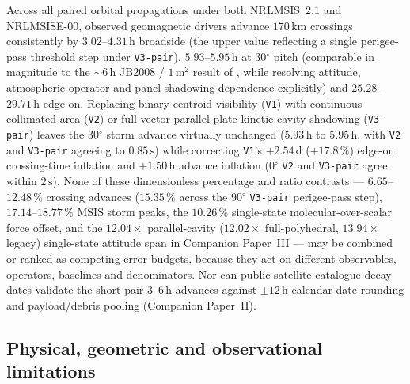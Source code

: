 \documentclass[12pt]{article}
\newcommand{\unit}[1]{\,\mathrm{#1}}
\newcommand{\degree}{\ensuremath{{}^\circ}}
\begin{document}
Across all paired orbital propagations under both NRLMSIS~2.1 and NRLMSISE-00, observed geomagnetic drivers advance $170\unit{km}$ crossings consistently by $3.02$--$4.31\unit{h}$ broadside (the upper value reflecting a single perigee-pass threshold step under \texttt{V3-pair}), $5.93$--$5.95\unit{h}$ at $30\degree$ pitch (comparable in magnitude to the $\sim6\unit{h}$ JB2008 / $1\unit{m^2}$ result of \citet{baruah2024}, while resolving attitude, atmospheric-operator and panel-shadowing dependence explicitly) and $25.28$--$29.71\unit{h}$ edge-on. Replacing binary centroid visibility (\texttt{V1}) with continuous collimated area (\texttt{V2}) or full-vector parallel-plate kinetic cavity shadowing (\texttt{V3-pair}) leaves the $30\degree$ storm advance virtually unchanged ($5.93\unit{h}$ to $5.95\unit{h}$, with \texttt{V2} and \texttt{V3-pair} agreeing to $0.85\unit{s}$) while correcting \texttt{V1}'s $+2.54\unit{d}$ ($+17.8\,\%$) edge-on crossing-time inflation and $+1.50\unit{h}$ advance inflation ($0\degree$ \texttt{V2} and \texttt{V3-pair} agree within $2\unit{s}$). None of these dimensionless percentage and ratio contrasts --- $6.65$--$12.48\,\%$ crossing advances ($15.35\,\%$ across the $90\degree$ \texttt{V3-pair} perigee-pass step), $17.14$--$18.77\,\%$ MSIS storm peaks, the $10.26\,\%$ single-state molecular-over-scalar force offset, and the $12.04\times$ parallel-cavity ($12.02\times$ full-polyhedral, $13.94\times$ legacy) single-state attitude span in Companion Paper~III --- may be combined or ranked as competing error budgets, because they act on different observables, operators, baselines and denominators. Nor can public satellite-catalogue decay dates validate the short-pair $3$--$6\unit{h}$ advances against $\pm12\unit{h}$ calendar-date rounding and payload/debris pooling (Companion Paper~II).

\subsection{Physical, geometric and observational limitations}
\label{sec:limits}
\end{document}
